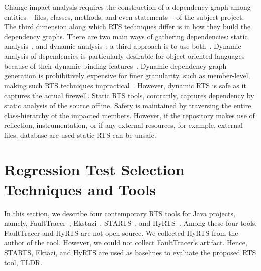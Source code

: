 Change impact analysis requires the construction of a dependency graph among entities -- files, classes, methods, and even statements -- of the subject project. The third dimension along which RTS techniques differ is in how they build the dependency graphs. There are two main ways of gathering dependencies: static analysis~\cite{rtsplusplus, starts}, and dynamic analysis~\cite{ekstazi, faulttracer}; a third approach is to use both~\cite{hyrts}. Dynamic analysis of dependencies is particularly desirable for object-oriented languages because of their dynamic binding features~\cite{rountev2004static}. Dynamic dependency graph generation is prohibitively expensive for finer granularity, such as member-level, making such RTS techniques impractical~\cite{fairley1978tutorial}. However, dynamic RTS is safe as it captures the actual firewell. Static RTS tools, contrarily, captures dependency by static analysis of the source offline. Safety is maintained by traversing the entire class-hierarchy of the impacted members. However, if the repository makes use of reflection, instrumentation, or if any external resources, for example, external files, database are used static RTS can be unsafe. 

\section{Regression Test Selection Techniques and Tools}

 In this section, we describe four contemporary RTS tools for Java projects, namely, FaultTracer~\cite{faulttracer}, Ekstazi~\cite{ekstazi}, STARTS~\cite{starts}, and HyRTS~\cite{hyrts}. Among these four tools, FaultTracer and HyRTS are not open-source. We collected HyRTS from the author of the tool. However, we could not collect FaultTracer's artifact. Hence, STARTS, Ektazi, and HyRTS are used as baselines to evaluate the proposed RTS tool, TLDR. 

